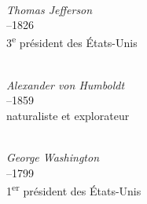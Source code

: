 \noindent\begin{minipage}[t][\textheight][s]{\textwidth}

\begin{center}

  \begin{minipage}[t]{0.31\textwidth}
    \centering
    \\
    {\figcaptionname\itshape Thomas Jefferson}\\
    {--1826 \\[-5pt] 3\textsuperscript{e} président des États-Unis}
  \end{minipage}
  \hfill
  \begin{minipage}[t]{0.31\textwidth}
    \centering
    \\
    {\figcaptionname\itshape Alexander von Humboldt}\\
    {--1859 \\[-5pt] naturaliste et explorateur}
  \end{minipage}
  \hfill
  \begin{minipage}[t]{0.31\textwidth}
    \centering
    \\
    {\figcaptionname\itshape George Washington}\\
    {--1799 \\[-5pt] 1\textsuperscript{er} président des États-Unis}
  \end{minipage}

\end{center}
\vfill
\begin{center}


\end{center}
\end{minipage}
